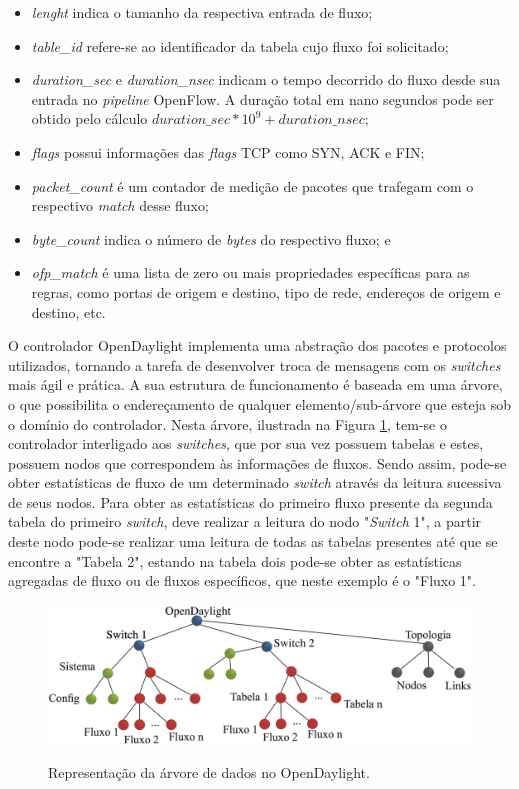 \begin{itemize}
    \item \textit{lenght} indica o tamanho da respectiva entrada de fluxo;
    \item \textit{table\_id} refere-se ao identificador da tabela cujo fluxo foi solicitado;
    \item \textit{duration\_sec} e \textit{duration\_nsec} indicam o tempo decorrido do fluxo desde sua entrada no \textit{pipeline} OpenFlow. A duração total em nano segundos pode ser obtido pelo cálculo $duration\_sec * 10^9 + duration\_nsec$;
    \item \textit{flags} possui informações das \textit{flags} TCP como SYN, ACK e FIN;
    \item \textit{packet\_count} é um contador de medição de pacotes que trafegam com o respectivo \textit{match} desse fluxo;
    \item \textit{byte\_count} indica o número de \textit{bytes} do respectivo fluxo; e
    \item \textit{ofp\_match} é uma lista de zero ou mais propriedades específicas para as regras, como portas de origem e destino, tipo de rede, endereços de origem e destino, etc.
\end{itemize}


O controlador OpenDaylight implementa uma abstração dos pacotes e protocolos utilizados, tornando a tarefa de desenvolver troca de mensagens com os \textit{switches} mais ágil e prática.
A sua estrutura de funcionamento é baseada em uma árvore, o que possibilita o endereçamento de qualquer elemento/sub-árvore que esteja sob o domínio do controlador. Nesta árvore, ilustrada na Figura \ref{fig:arvore-dados}, tem-se o controlador interligado aos \textit{switches}, que por sua vez possuem tabelas e estes, possuem nodos que correspondem às informações de fluxos. Sendo assim, pode-se obter estatísticas de fluxo de um determinado \textit{switch} através da leitura sucessiva de seus nodos. Para obter as estatísticas do primeiro fluxo presente da segunda tabela do primeiro \textit{switch}, deve realizar a leitura do nodo "\textit{Switch} 1", a partir deste nodo pode-se realizar uma leitura de todas as tabelas presentes até que se encontre a "Tabela 2", estando na tabela dois pode-se obter as estatísticas agregadas de fluxo ou de fluxos específicos, que neste exemplo é o "Fluxo 1".

\begin{figure}[H]
  \centering
  \caption{Representação da árvore de dados no OpenDaylight.}
  \includegraphics[width=.9\textwidth]{images/arvore.eps}
  \label{fig:arvore-dados}
\end{figure}

